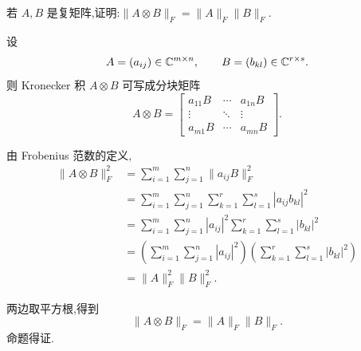 \begin{problem}
若 $A,B$ 是复矩阵,证明:$\|A\otimes B\|_F=\|A\|_F\|B\|_F$.
\begin{solution}
    设
    \[
        A=(a_{ij})\in\mathbb{C}^{m\times n},\qquad B=(b_{kl})\in\mathbb{C}^{r\times s}.
    \]
    则 Kronecker 积 $A\otimes B$ 可写成分块矩阵
    \[
        A\otimes B=
        \begin{bmatrix}
            a_{11}B & \cdots & a_{1n}B \\
            \vdots & \ddots & \vdots \\
            a_{m1}B & \cdots & a_{mn}B
        \end{bmatrix}.
    \]

    由 Frobenius 范数的定义,
    \begin{align*}
        \|A\otimes B\|_F^2
        &= \sum_{i=1}^{m}\sum_{j=1}^{n}\|a_{ij}B\|_F^2 \\
        &= \sum_{i=1}^{m}\sum_{j=1}^{n}\sum_{k=1}^{r}\sum_{l=1}^{s}|a_{ij}b_{kl}|^2 \\
        &= \sum_{i=1}^{m}\sum_{j=1}^{n}|a_{ij}|^2\sum_{k=1}^{r}\sum_{l=1}^{s}|b_{kl}|^2 \\
        &= \left(\sum_{i=1}^{m}\sum_{j=1}^{n}|a_{ij}|^2\right)\left(\sum_{k=1}^{r}\sum_{l=1}^{s}|b_{kl}|^2\right) \\
        &= \|A\|_F^2\|B\|_F^2.
    \end{align*}

    两边取平方根,得到
    \[
        \|A\otimes B\|_F=\|A\|_F\|B\|_F.
    \]
    命题得证.
\end{solution}
\end{problem}

